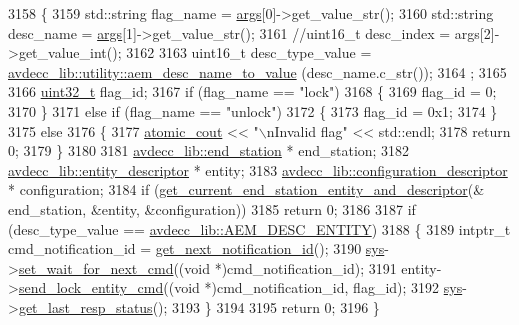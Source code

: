 \begin{DoxyCode}
3158 \{
3159     std::string flag\_name = \hyperlink{namespaceastime__fitline_a8187411843a6284ffb964ef3fb9fcab3}{args}[0]->get\_value\_str();
3160     std::string desc\_name = \hyperlink{namespaceastime__fitline_a8187411843a6284ffb964ef3fb9fcab3}{args}[1]->get\_value\_str();
3161     \textcolor{comment}{//uint16\_t desc\_index = args[2]->get\_value\_int();}
3162 
3163     uint16\_t desc\_type\_value = \hyperlink{namespaceavdecc__lib_1_1utility_a9f6076e32fa227555a95b6e95ea1e29b}{avdecc\_lib::utility::aem\_desc\_name\_to\_value}
      (desc\_name.c\_str());
3164     ;
3165 
3166     \hyperlink{parse_8c_a6eb1e68cc391dd753bc8ce896dbb8315}{uint32\_t} flag\_id;
3167     \textcolor{keywordflow}{if} (flag\_name == \textcolor{stringliteral}{"lock"})
3168     \{
3169         flag\_id = 0;
3170     \}
3171     \textcolor{keywordflow}{else} \textcolor{keywordflow}{if} (flag\_name == \textcolor{stringliteral}{"unlock"})
3172     \{
3173         flag\_id = 0x1;
3174     \}
3175     \textcolor{keywordflow}{else}
3176     \{
3177         \hyperlink{cmd__line_8h_a0bc38ccc65c79ba06c6fcd7b4bf554c3}{atomic\_cout} << \textcolor{stringliteral}{"\(\backslash\)nInvalid flag"} << std::endl;
3178         \textcolor{keywordflow}{return} 0;
3179     \}
3180 
3181     \hyperlink{classavdecc__lib_1_1end__station}{avdecc\_lib::end\_station} * end\_station;
3182     \hyperlink{classavdecc__lib_1_1entity__descriptor}{avdecc\_lib::entity\_descriptor} * entity;
3183     \hyperlink{classavdecc__lib_1_1configuration__descriptor}{avdecc\_lib::configuration\_descriptor} * configuration;
3184     \textcolor{keywordflow}{if} (\hyperlink{classcmd__line_ac2d4611fba7db03d436a2e3c1e64828e}{get\_current\_end\_station\_entity\_and\_descriptor}(&
      end\_station, &entity, &configuration))
3185         \textcolor{keywordflow}{return} 0;
3186 
3187     \textcolor{keywordflow}{if} (desc\_type\_value == \hyperlink{namespaceavdecc__lib_ac7b7d227e46bc72b63ee9e9aae15902fac9ebb31a55e5894637f6c3c710ceceaf}{avdecc\_lib::AEM\_DESC\_ENTITY})
3188     \{
3189         intptr\_t cmd\_notification\_id = \hyperlink{classcmd__line_a57486218387d1aa9d262eb7c176154ad}{get\_next\_notification\_id}();
3190         \hyperlink{classcmd__line_a485db4800e331cb4052c447fdf5d154e}{sys}->\hyperlink{classavdecc__lib_1_1system_a26b769584f10225077da47583edda33e}{set\_wait\_for\_next\_cmd}((\textcolor{keywordtype}{void} *)cmd\_notification\_id);
3191         entity->\hyperlink{classavdecc__lib_1_1descriptor__base_a1ac1f5c700f4eebd37b7c45498b36bbc}{send\_lock\_entity\_cmd}((\textcolor{keywordtype}{void} *)cmd\_notification\_id, flag\_id);
3192         \hyperlink{classcmd__line_a485db4800e331cb4052c447fdf5d154e}{sys}->\hyperlink{classavdecc__lib_1_1system_aa63e8d1a4e51f695cdcccc9340922407}{get\_last\_resp\_status}();
3193     \}
3194 
3195     \textcolor{keywordflow}{return} 0;
3196 \}
\end{DoxyCode}


